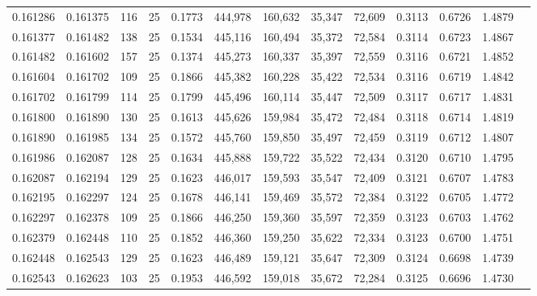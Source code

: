 \begin{tabular}{rrrrrrrrrrrrr}
0.161286 & 0.161375 &   116 &  25 &                                     0.1773 & 444,978 & 160,632 &  35,347 &  72,609 & 0.3113 & 0.6726 & 1.4879 \\
0.161377 & 0.161482 &   138 &  25 &                                     0.1534 & 445,116 & 160,494 &  35,372 &  72,584 & 0.3114 & 0.6723 & 1.4867 \\
0.161482 & 0.161602 &   157 &  25 &                                     0.1374 & 445,273 & 160,337 &  35,397 &  72,559 & 0.3116 & 0.6721 & 1.4852 \\
0.161604 & 0.161702 &   109 &  25 &                                     0.1866 & 445,382 & 160,228 &  35,422 &  72,534 & 0.3116 & 0.6719 & 1.4842 \\
0.161702 & 0.161799 &   114 &  25 &                                     0.1799 & 445,496 & 160,114 &  35,447 &  72,509 & 0.3117 & 0.6717 & 1.4831 \\
0.161800 & 0.161890 &   130 &  25 &                                     0.1613 & 445,626 & 159,984 &  35,472 &  72,484 & 0.3118 & 0.6714 & 1.4819 \\
0.161890 & 0.161985 &   134 &  25 &                                     0.1572 & 445,760 & 159,850 &  35,497 &  72,459 & 0.3119 & 0.6712 & 1.4807 \\
0.161986 & 0.162087 &   128 &  25 &                                     0.1634 & 445,888 & 159,722 &  35,522 &  72,434 & 0.3120 & 0.6710 & 1.4795 \\
0.162087 & 0.162194 &   129 &  25 &                                     0.1623 & 446,017 & 159,593 &  35,547 &  72,409 & 0.3121 & 0.6707 & 1.4783 \\
0.162195 & 0.162297 &   124 &  25 &                                     0.1678 & 446,141 & 159,469 &  35,572 &  72,384 & 0.3122 & 0.6705 & 1.4772 \\
0.162297 & 0.162378 &   109 &  25 &                                     0.1866 & 446,250 & 159,360 &  35,597 &  72,359 & 0.3123 & 0.6703 & 1.4762 \\
0.162379 & 0.162448 &   110 &  25 &                                     0.1852 & 446,360 & 159,250 &  35,622 &  72,334 & 0.3123 & 0.6700 & 1.4751 \\
0.162448 & 0.162543 &   129 &  25 &                                     0.1623 & 446,489 & 159,121 &  35,647 &  72,309 & 0.3124 & 0.6698 & 1.4739 \\
0.162543 & 0.162623 &   103 &  25 &                                     0.1953 & 446,592 & 159,018 &  35,672 &  72,284 & 0.3125 & 0.6696 & 1.4730 \\

\end{tabular}
